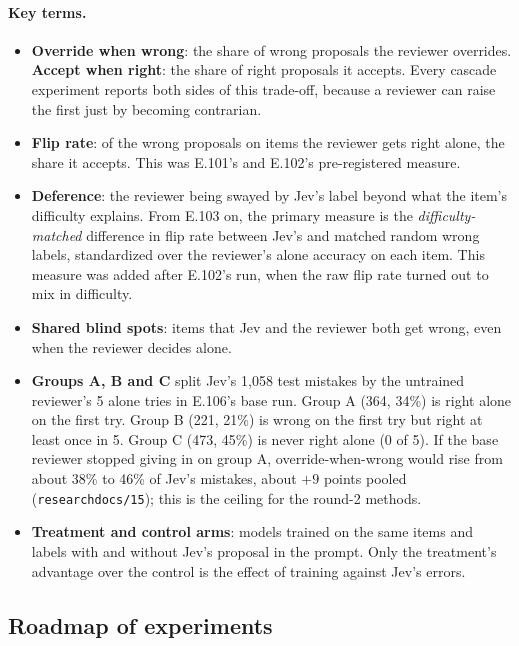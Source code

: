\documentclass[11pt]{article}
\renewcommand{\_}{\origunderscore\allowbreak}
\begin{document}
\paragraph{Key terms.}
\begin{itemize}[leftmargin=*,itemsep=2pt]
  \item \textbf{Override when wrong}: the share of wrong proposals the reviewer overrides. \textbf{Accept when right}: the share of right proposals it accepts. Every cascade experiment reports both sides of this trade-off, because a reviewer can raise the first just by becoming contrarian.
  \item \textbf{Flip rate}: of the wrong proposals on items the reviewer gets right alone, the share it accepts. This was E.101's and E.102's pre-registered measure.
  \item \textbf{Deference}: the reviewer being swayed by Jev's label beyond what the item's difficulty explains. From E.103 on, the primary measure is the \emph{difficulty-matched} difference in flip rate between Jev's and matched random wrong labels, standardized over the reviewer's alone accuracy on each item. This measure was added after E.102's run, when the raw flip rate turned out to mix in difficulty.
  \item \textbf{Shared blind spots}: items that Jev and the reviewer both get wrong, even when the reviewer decides alone.
  \item \textbf{Groups A, B and C} split Jev's 1,058 test mistakes by the untrained reviewer's 5 alone tries in E.106's base run. Group A (364, 34\%) is right alone on the first try. Group B (221, 21\%) is wrong on the first try but right at least once in 5. Group C (473, 45\%) is never right alone (0 of 5). If the base reviewer stopped giving in on group A, override-when-wrong would rise from about 38\% to 46\% of Jev's mistakes, about $+9$ points pooled (\texttt{research\_docs/15}); this is the ceiling for the round-2 methods.
  \item \textbf{Treatment and control arms}: models trained on the same items and labels with and without Jev's proposal in the prompt. Only the treatment's advantage over the control is the effect of training against Jev's errors.
\end{itemize}

\subsection{Roadmap of experiments}\label{sec:roadmap}
\end{document}
